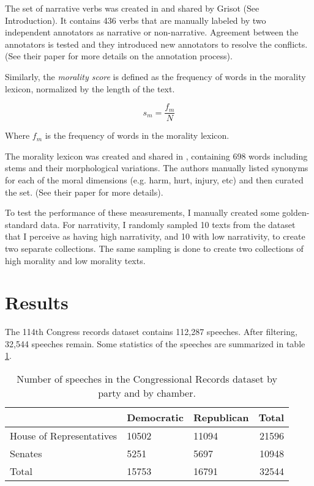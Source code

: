 \documentclass[a4paper]{article}
\begin{document}
The set of narrative verbs was created in \cite{grisot2014cross} and shared by Grisot (See Introduction). It contains 436 verbs that are manually labeled by two independent annotators as narrative or non-narrative. Agreement between the annotators is tested and they introduced new annotators to resolve the conflicts. (See their paper for more details on the annotation process).

Similarly, the \emph{morality score} is defined as the frequency of words in the morality lexicon, normalized by the length of the text. 

\begin{equation}
s_m = \frac{f_m}{N}
\end{equation}

Where $f_m$ is the frequency of words in the morality lexicon.

The morality lexicon was created and shared in \cite{graham2009liberals}, containing 698 words including stems and their morphological variations. The authors manually listed synonyms for each of the moral dimensions (e.g. harm, hurt, injury, etc) and then curated the set. (See their paper for more details). 

To test the performance of these measurements, I manually created some golden-standard data. For narrativity, I randomly sampled 10 texts from the dataset that I perceive as having high narrativity, and 10 with low narrativity, to create two separate collections. The same sampling is done to create two collections of high morality and low morality texts.


\section*{Results}

The 114th Congress records dataset contains 112,287 speeches. After filtering, 32,544 speeches remain. Some statistics of the speeches are summarized in table \ref{tab:stats}. 

\begin{table}
\centering
\begin{tabular}{l|l|l|r}
\toprule
 &  Democratic & Republican & Total\\\hline
House of Representatives & 10502 & 11094 & 21596 \\
Senates & 5251 & 5697 & 10948  \\
\hline
Total & 15753 & 16791 & 32544\\
\bottomrule
\end{tabular}
\caption{\label{tab:stats} Number of speeches in the Congressional Records dataset by party and by chamber.}
\end{table}
\end{document}
